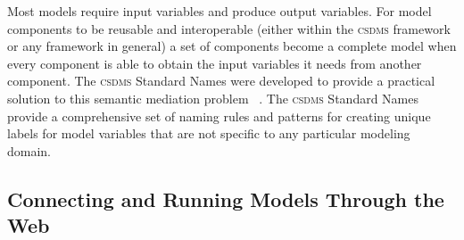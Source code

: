 \documentclass[11pt, oneside]{amsart}
\newcommand{\huttonnote}[1]{ {\textcolor{magenta}    { ***Eric:      #1 }}}
\DeclareRobustCommand{\csdms}{\textsc{csdms}}
\begin{document}
Most models require input variables and produce output variables. For model
components to be reusable and interoperable (either within the \csdms{}
framework or any framework in general)
a set of components become a complete model when every component is able to
obtain the input variables it needs from another component. The \csdms{}
Standard Names were developed to provide a practical solution to this
semantic mediation problem ~\cite{peckham2012component, syvitski2014plug}.
The \csdms{} Standard Names provide a comprehensive set of naming rules and
patterns for creating unique labels for model variables that are not specific
to any particular modeling domain.



\subsection{Connecting and Running Models Through the Web}
\label{sec:wmt}

\end{document}

